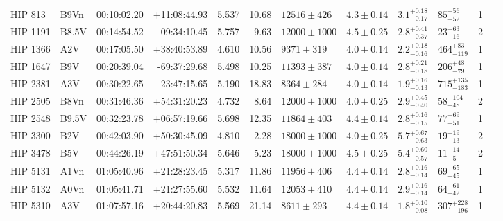 \begin{tiny}
\begin{longtable}{|l|lrrrrllllll|}
     HIP 813 &     B9Vn &    00:10:02.20 &   +11:08:44.93 &   5.537 &     10.68 &   $12516 \pm 426$ &  $4.3 \pm 0.14$ &  $3.1^{+0.18}_{-0.17}$ &      $85^{+56}_{-52}$ &       1 \\
    HIP 1191 &    B8.5V &    00:14:54.52 &   -09:34:10.45 &   5.757 &      9.63 &  $12000 \pm 1000$ &  $4.5 \pm 0.25$ &  $2.8^{+0.41}_{-0.37}$ &      $23^{+63}_{-16}$ &       2 \\
    HIP 1366 &      A2V &    00:17:05.50 &   +38:40:53.89 &   4.610 &     10.56 &    $9371 \pm 319$ &  $4.0 \pm 0.14$ &  $2.2^{+0.18}_{-0.16}$ &    $464^{+83}_{-119}$ &       1 \\
    HIP 1647 &      B9V &    00:20:39.04 &   -69:37:29.68 &   5.498 &     10.25 &   $11393 \pm 387$ &  $4.0 \pm 0.14$ &  $2.8^{+0.21}_{-0.18}$ &     $206^{+48}_{-79}$ &       1 \\
    HIP 2381 &      A3V &    00:30:22.65 &   -23:47:15.65 &   5.190 &     18.83 &    $8364 \pm 284$ &  $4.0 \pm 0.14$ &  $1.9^{+0.16}_{-0.13}$ &   $715^{+135}_{-183}$ &       1 \\
    HIP 2505 &     B8Vn &    00:31:46.36 &   +54:31:20.23 &   4.732 &      8.64 &  $12000 \pm 1000$ &  $4.0 \pm 0.25$ &  $2.9^{+0.45}_{-0.40}$ &     $58^{+104}_{-48}$ &       2 \\
    HIP 2548 &    B9.5V &    00:32:23.78 &   +06:57:19.66 &   5.698 &     12.35 &   $11864 \pm 403$ &  $4.4 \pm 0.14$ &  $2.8^{+0.16}_{-0.15}$ &      $77^{+69}_{-51}$ &       1 \\
    HIP 3300 &      B2V &    00:42:03.90 &   +50:30:45.09 &   4.810 &      2.28 &  $18000 \pm 1000$ &  $4.0 \pm 0.25$ &  $5.7^{+0.67}_{-0.63}$ &      $19^{+19}_{-13}$ &       2 \\
    HIP 3478 &      B5V &    00:44:26.19 &   +47:51:50.34 &   5.646 &      5.23 &  $18000 \pm 1000$ &  $4.5 \pm 0.25$ &  $5.4^{+0.60}_{-0.57}$ &       $11^{+14}_{-5}$ &       2 \\
    HIP 5131 &     A1Vn &    01:05:40.96 &   +21:28:23.45 &   5.317 &     11.86 &   $11956 \pm 406$ &  $4.4 \pm 0.14$ &  $2.8^{+0.16}_{-0.14}$ &      $69^{+65}_{-45}$ &       1 \\
    HIP 5132 &     A0Vn &    01:05:41.71 &   +21:27:55.60 &   5.532 &     11.64 &   $12053 \pm 410$ &  $4.4 \pm 0.14$ &  $2.9^{+0.16}_{-0.14}$ &      $64^{+61}_{-42}$ &       1 \\
    HIP 5310 &      A3V &    01:07:57.16 &   +20:44:20.83 &   5.569 &     21.14 &    $8611 \pm 293$ &  $4.4 \pm 0.14$ &  $1.8^{+0.10}_{-0.08}$ &   $307^{+228}_{-196}$ &       1 \\

\end{longtable}
\end{tiny}
